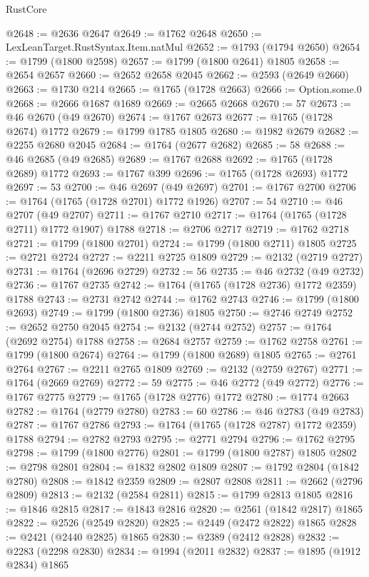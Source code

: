 \begin{lexlean}{RustCore}
\begin{coremodule}
@2648 := @2636 @2647
@2649 := @1762 @2648
@2650 := LexLeanTarget.RustSyntax.Item.natMul
@2652 := @1793 (@1794 @2650)
@2654 := @1799 (@1800 @2598)
@2657 := @1799 (@1800 @2641) @1805
@2658 := @2654 @2657
@2660 := @2652 @2658 @2045
@2662 := @2593 (@2649 @2660)
@2663 := @1730 @214
@2665 := @1765 (@1728 @2663)
@2666 := Option.some.{0}
@2668 := @2666 @1687 @1689
@2669 := @2665 @2668
@2670 := 57
@2673 := @46 @2670 (@49 @2670)
@2674 := @1767 @2673
@2677 := @1765 (@1728 @2674) @1772
@2679 := @1799 @1785 @1805
@2680 := @1982 @2679
@2682 := @2255 @2680 @2045
@2684 := @1764 (@2677 @2682)
@2685 := 58
@2688 := @46 @2685 (@49 @2685)
@2689 := @1767 @2688
@2692 := @1765 (@1728 @2689) @1772
@2693 := @1767 @399
@2696 := @1765 (@1728 @2693) @1772
@2697 := 53
@2700 := @46 @2697 (@49 @2697)
@2701 := @1767 @2700
@2706 := @1764 (@1765 (@1728 @2701) @1772 @1926)
@2707 := 54
@2710 := @46 @2707 (@49 @2707)
@2711 := @1767 @2710
@2717 := @1764 (@1765 (@1728 @2711) @1772 @1907) @1788
@2718 := @2706 @2717
@2719 := @1762 @2718
@2721 := @1799 (@1800 @2701)
@2724 := @1799 (@1800 @2711) @1805
@2725 := @2721 @2724
@2727 := @2211 @2725 @1809
@2729 := @2132 (@2719 @2727)
@2731 := @1764 (@2696 @2729)
@2732 := 56
@2735 := @46 @2732 (@49 @2732)
@2736 := @1767 @2735
@2742 := @1764 (@1765 (@1728 @2736) @1772 @2359) @1788
@2743 := @2731 @2742
@2744 := @1762 @2743
@2746 := @1799 (@1800 @2693)
@2749 := @1799 (@1800 @2736) @1805
@2750 := @2746 @2749
@2752 := @2652 @2750 @2045
@2754 := @2132 (@2744 @2752)
@2757 := @1764 (@2692 @2754) @1788
@2758 := @2684 @2757
@2759 := @1762 @2758
@2761 := @1799 (@1800 @2674)
@2764 := @1799 (@1800 @2689) @1805
@2765 := @2761 @2764
@2767 := @2211 @2765 @1809
@2769 := @2132 (@2759 @2767)
@2771 := @1764 (@2669 @2769)
@2772 := 59
@2775 := @46 @2772 (@49 @2772)
@2776 := @1767 @2775
@2779 := @1765 (@1728 @2776) @1772
@2780 := @1774 @2663
@2782 := @1764 (@2779 @2780)
@2783 := 60
@2786 := @46 @2783 (@49 @2783)
@2787 := @1767 @2786
@2793 := @1764 (@1765 (@1728 @2787) @1772 @2359) @1788
@2794 := @2782 @2793
@2795 := @2771 @2794
@2796 := @1762 @2795
@2798 := @1799 (@1800 @2776)
@2801 := @1799 (@1800 @2787) @1805
@2802 := @2798 @2801
@2804 := @1832 @2802 @1809
@2807 := @1792 @2804 (@1842 @2780)
@2808 := @1842 @2359
@2809 := @2807 @2808
@2811 := @2662 (@2796 @2809)
@2813 := @2132 (@2584 @2811)
@2815 := @1799 @2813 @1805
@2816 := @1846 @2815
@2817 := @1843 @2816
@2820 := @2561 (@1842 @2817) @1865
@2822 := @2526 (@2549 @2820)
@2825 := @2449 (@2472 @2822) @1865
@2828 := @2421 (@2440 @2825) @1865
@2830 := @2389 (@2412 @2828)
@2832 := @2283 (@2298 @2830)
@2834 := @1994 (@2011 @2832)
@2837 := @1895 (@1912 @2834) @1865

\end{coremodule}
\end{lexlean}
